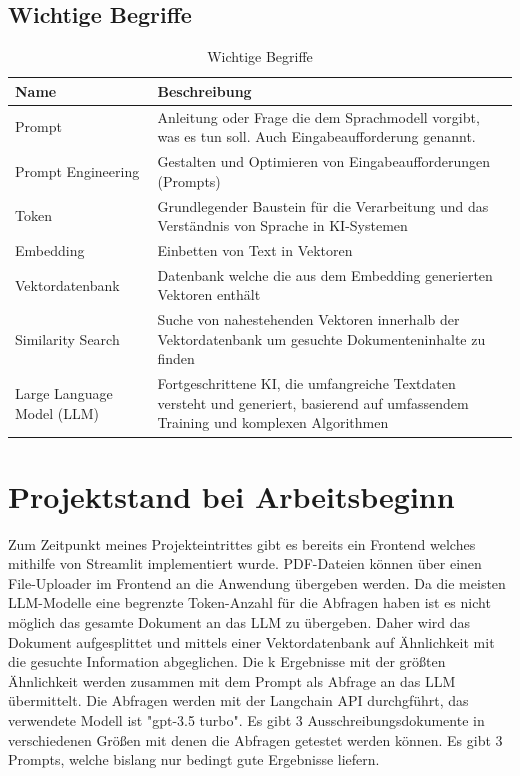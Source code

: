 \subsection{Wichtige Begriffe}

\begin{table}[H]
    \centering
    \caption{Wichtige Begriffe}
    \label{tab:technologien}
    \begin{tabular}{|>{\centering\arraybackslash}m{4cm}|p{10cm}|} %
    \hline
    \textbf{Name} & \textbf{Beschreibung} \\ \hline
    Prompt & Anleitung oder Frage die dem Sprachmodell vorgibt, was es tun soll. Auch Eingabeaufforderung genannt. \\ \hline
    Prompt Engineering & Gestalten und Optimieren von Eingabeaufforderungen (Prompts) \\ \hline
    Token & Grundlegender Baustein für die Verarbeitung und das Verständnis von Sprache in KI-Systemen  \\ \hline
    Embedding & Einbetten von Text in Vektoren \\ \hline
    Vektordatenbank & Datenbank welche die aus dem Embedding generierten Vektoren enthält \\ \hline
    Similarity Search & Suche von nahestehenden Vektoren innerhalb der Vektordatenbank um gesuchte Dokumenteninhalte zu
    finden \\ \hline
    Large Language Model (LLM) & Fortgeschrittene KI, die umfangreiche Textdaten versteht und generiert, basierend auf umfassendem Training und komplexen Algorithmen \\ \hline
    \end{tabular}
\end{table}

\section{Projektstand bei Arbeitsbeginn}
Zum Zeitpunkt meines Projekteintrittes gibt es bereits ein Frontend welches mithilfe von Streamlit implementiert wurde. 
PDF-Dateien können über einen File-Uploader im Frontend an die Anwendung übergeben werden. Da die meisten LLM-Modelle eine 
begrenzte Token-Anzahl für die Abfragen haben ist es nicht möglich das gesamte Dokument an das LLM zu übergeben. 
Daher wird das Dokument aufgesplittet und mittels einer Vektordatenbank auf Ähnlichkeit mit die gesuchte Information 
abgeglichen. Die k Ergebnisse mit der größten Ähnlichkeit werden zusammen mit dem Prompt als Abfrage an das LLM übermittelt. 
Die Abfragen werden mit der Langchain API durchgführt, das verwendete Modell ist "gpt-3.5 turbo". Es gibt 3 Ausschreibungsdokumente 
in verschiedenen Größen mit denen die Abfragen getestet werden können. Es gibt 3 Prompts, welche bislang nur bedingt gute 
Ergebnisse liefern.

